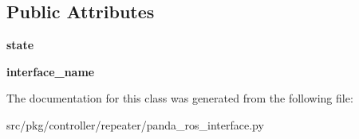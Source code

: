 \subsection*{Public Attributes}
\begin{DoxyCompactItemize}
\item 
\mbox{\label{classrnb-planning_1_1src_1_1pkg_1_1controller_1_1repeater_1_1panda__ros__interface_1_1_panda_state_subscriber_a5a2627f5d3cd53ea8fc19780c925eab6}} 
{\bfseries state}
\item 
\mbox{\label{classrnb-planning_1_1src_1_1pkg_1_1controller_1_1repeater_1_1panda__ros__interface_1_1_panda_state_subscriber_aaba28733f213c660dd03478e9f889f56}} 
{\bfseries interface\+\_\+name}
\end{DoxyCompactItemize}


The documentation for this class was generated from the following file\+:\begin{DoxyCompactItemize}
\item 
src/pkg/controller/repeater/panda\+\_\+ros\+\_\+interface.\+py\end{DoxyCompactItemize}
